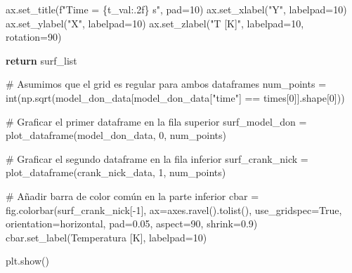 \documentclass[
  spanish,
  us-letterpaper,
  DIV=11,
  numbers=noendperiod]{scrreprt}
\newenvironment{Shaded}{\begin{snugshade}}{\end{snugshade}}
\newcommand{\BuiltInTok}[1]{\textcolor[rgb]{0.00,0.23,0.31}{#1}}
\newcommand{\CommentTok}[1]{\textcolor[rgb]{0.37,0.37,0.37}{#1}}
\newcommand{\ControlFlowTok}[1]{\textcolor[rgb]{0.00,0.23,0.31}{\textbf{#1}}}
\newcommand{\DecValTok}[1]{\textcolor[rgb]{0.68,0.00,0.00}{#1}}
\newcommand{\FloatTok}[1]{\textcolor[rgb]{0.68,0.00,0.00}{#1}}
\newcommand{\NormalTok}[1]{\textcolor[rgb]{0.00,0.23,0.31}{#1}}
\newcommand{\OperatorTok}[1]{\textcolor[rgb]{0.37,0.37,0.37}{#1}}
\newcommand{\SpecialCharTok}[1]{\textcolor[rgb]{0.37,0.37,0.37}{#1}}
\newcommand{\SpecialStringTok}[1]{\textcolor[rgb]{0.13,0.47,0.30}{#1}}
\newcommand{\StringTok}[1]{\textcolor[rgb]{0.13,0.47,0.30}{#1}}
\newcommand{\VariableTok}[1]{\textcolor[rgb]{0.07,0.07,0.07}{#1}}
\theoremstyle{plain}
\theoremstyle{definition}
\theoremstyle{remark}
\begin{document}
\begin{Shaded}
\begin{Highlighting}[]
\NormalTok{        ax.set\_title(}\SpecialStringTok{f"Time = }\SpecialCharTok{\{}\NormalTok{t\_val}\SpecialCharTok{:.2f\}}\SpecialStringTok{ s"}\NormalTok{, pad}\OperatorTok{=}\DecValTok{10}\NormalTok{)}
\NormalTok{        ax.set\_xlabel(}\StringTok{"Y"}\NormalTok{, labelpad}\OperatorTok{=}\DecValTok{10}\NormalTok{)}
\NormalTok{        ax.set\_ylabel(}\StringTok{"X"}\NormalTok{, labelpad}\OperatorTok{=}\DecValTok{10}\NormalTok{)}
\NormalTok{        ax.set\_zlabel(}\StringTok{"T [K]"}\NormalTok{, labelpad}\OperatorTok{=}\DecValTok{10}\NormalTok{, rotation}\OperatorTok{=}\DecValTok{90}\NormalTok{)}
    
    \ControlFlowTok{return}\NormalTok{ surf\_list}

\CommentTok{\# Asumimos que el grid es regular para ambos dataframes}
\NormalTok{num\_points }\OperatorTok{=} \BuiltInTok{int}\NormalTok{(np.sqrt(model\_don\_data[model\_don\_data[}\StringTok{"time"}\NormalTok{] }\OperatorTok{==}\NormalTok{ times[}\DecValTok{0}\NormalTok{]].shape[}\DecValTok{0}\NormalTok{]))}

\CommentTok{\# Graficar el primer dataframe en la fila superior}
\NormalTok{surf\_model\_don }\OperatorTok{=}\NormalTok{ plot\_dataframe(model\_don\_data, }\DecValTok{0}\NormalTok{, num\_points)}

\CommentTok{\# Graficar el segundo dataframe en la fila inferior}
\NormalTok{surf\_crank\_nick }\OperatorTok{=}\NormalTok{ plot\_dataframe(crank\_nick\_data, }\DecValTok{1}\NormalTok{, num\_points)}

\CommentTok{\# Añadir barra de color común en la parte inferior}
\NormalTok{cbar }\OperatorTok{=}\NormalTok{ fig.colorbar(surf\_crank\_nick[}\OperatorTok{{-}}\DecValTok{1}\NormalTok{], ax}\OperatorTok{=}\NormalTok{axes.ravel().tolist(),}
\NormalTok{                    use\_gridspec}\OperatorTok{=}\VariableTok{True}\NormalTok{, orientation}\OperatorTok{=}\StringTok{\textquotesingle{}horizontal\textquotesingle{}}\NormalTok{,}
\NormalTok{                    pad}\OperatorTok{=}\FloatTok{0.05}\NormalTok{, aspect}\OperatorTok{=}\DecValTok{90}\NormalTok{, shrink}\OperatorTok{=}\FloatTok{0.9}\NormalTok{)}
\NormalTok{cbar.set\_label(}\StringTok{\textquotesingle{}Temperatura [K]\textquotesingle{}}\NormalTok{, labelpad}\OperatorTok{=}\DecValTok{10}\NormalTok{)}


\NormalTok{plt.show()}
\end{Highlighting}
\end{Shaded}
\end{document}
